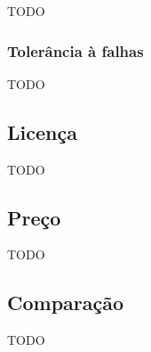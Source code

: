 TODO

\subsubsection{Tolerância à falhas}

TODO

\subsection{Licença}

TODO

\subsection{Preço}

TODO

\subsection{Comparação}

TODO
